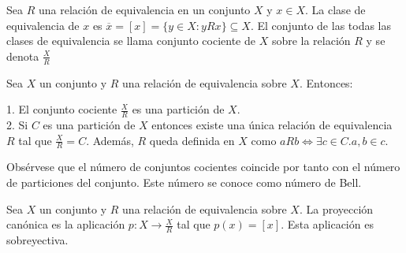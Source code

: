 \begin{definition}
	Sea $R$ una relación de equivalencia en un conjunto $X$ y $x \in X$. La clase de equivalencia de $x$ es $\overline{x} = [x] = \{y \in X:yRx\} \subseteq X$. El conjunto de las todas las clases de equivalencia se llama conjunto cociente de $X$ sobre la relación $R$ y se denota $\frac{X}{R}$
\end{definition}

\begin{theorem}
	Sea $X$ un conjunto y $R$ una relación de equivalencia sobre $X$. Entonces:
	
	1. El conjunto cociente $\frac{X}{R}$ es una partición de $X$. \\
	2. Si $C$ es una partición de $X$ entonces existe una única relación de equivalencia $R$ tal que $\frac{X}{R} = C$. Además, $R$ queda definida en $X$ como $aRb \iff \exists c \in C.a,b \in c$. 
\end{theorem}

Obsérvese que el número de conjuntos cocientes coincide por tanto con el número de particiones del conjunto. Este número se conoce como número de Bell. \cite{link2}

\begin{definition}
	Sea $X$ un conjunto y $R$ una relación de equivalencia sobre $X$. La proyección canónica es la aplicación $p: X \to \frac{X}{R}$ tal que $p(x) = [x]$. Esta aplicación es sobreyectiva. 
\end{definition}

